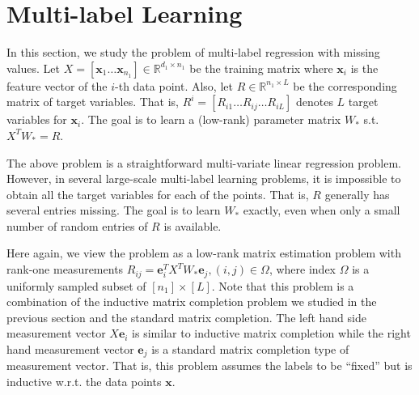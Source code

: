 \documentclass[11pt]{article}
\newcommand{\e}{\bm{e}}
\newcommand{\R}{\mathbb{R}}
\newcommand{\tp}[1]{{#1}^{T}}
\newcommand{\Wo}{W_*}
\newcommand{\x}{\bm{x}}
\begin{document}



\section{Multi-label Learning}\label{sec:mult}
In this section, we study the problem of multi-label regression with missing values. Let $X=[\x_1 \dots \x_{n_1}]\in \R^{d_1\times n_1}$ be the training matrix where  $\x_i$ is the feature vector of the $i$-th data point. Also, let $R\in \mathbb{R}^{n_1\times L}$ be the corresponding matrix of target variables. That is, $R^i=[R_{i1} \dots R_{ij} \dots R_{iL}]$ denotes $L$ target variables for $\x_i$. The goal is to learn a (low-rank) parameter matrix $\Wo$ s.t. $\tp{X}\Wo=R$.

The above problem is a straightforward multi-variate linear regression problem. However, in several large-scale multi-label learning problems, it is impossible to obtain all the target variables for each of the points. That is, $R$ generally has several entries missing. The goal is to learn $\Wo$ exactly, even when only a small number of random entries of $R$ is available. 

Here again, we view the problem as a low-rank matrix estimation problem with rank-one measurements $R_{ij}=\tp{\e}_i\tp{X}\Wo\e_j, (i,j)\in \Omega$, where index $\Omega$ is a uniformly sampled subset of $[n_1]\times [L]$. Note that this problem is a combination of the inductive matrix completion problem we studied in the previous section and the standard matrix completion. The left hand side measurement vector $X\e_i$ is similar to inductive matrix completion while the right hand measurement vector $\e_j$ is a standard matrix completion type of measurement vector. That is, this problem assumes the labels to be ``fixed'' but is inductive w.r.t. the data points $\x$. 
\end{document}
